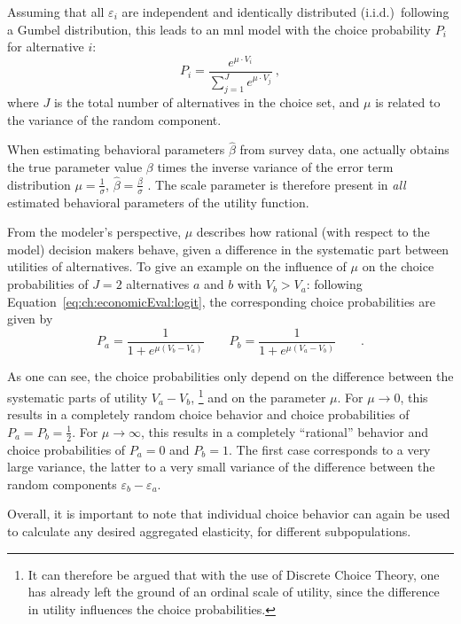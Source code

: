 \begin{oframed}
Assuming that all $\varepsilon_i$ are independent and identically distributed (i.i.d.)\ following a Gumbel distribution, this leads to an \gls{mnl} model with the choice probability $P_i$ for alternative $i$:
%
\begin{equation}
P_{i} = \frac{e^{\mu \cdot V_i}}{\sum_{j=1}^{J} e^{\mu \cdot V_{j}}} \ ,
\label{eq:ch:economicEval:logit}
\end{equation}
%
%
where $J$ is the total number of alternatives in the choice set, and $\mu$ is related to the variance of the random component.%

%
When estimating behavioral parameters $\hat{\beta}$ from survey data, one actually obtains the true parameter value $\beta$ times the inverse variance of the error term distribution $\mu = \frac{1}{\sigma}$, \ie $\hat{\beta} = \frac{\beta}{\sigma}$ \citep[see, e.g.,][p.45, where $\sigma$ is defined as \emph{scale parameter}]{Train2003discreteChoiceBook}. The scale parameter is therefore present in \emph{all} estimated behavioral parameters of the utility function.
%

From the modeler's perspective, $\mu$ describes how rational (with respect to the model) decision makers behave, given a difference in the systematic part between utilities of alternatives. To give an example on the influence of $\mu$ on the choice probabilities of $J=2$ alternatives $a$ and $b$ with $V_b > V_a$: following Equation~\ref{eq:ch:economicEval:logit}, the corresponding choice probabilities are given by
%
\[
P_a = \frac{1}{1 + e^{\mu(V_b - V_a)}} \qquad P_b = \frac{1}{1 + e^{\mu(V_a - V_b)}} \qquad .
\]

%
As one can see, the choice probabilities only depend on the difference between the systematic parts of utility $V_a - V_b$,%
%
\footnote{
%
It can therefore be argued that with the use of Discrete Choice Theory, one has already left the ground of an ordinal scale of utility, since the difference in utility influences the choice probabilities.
%
}
%
and on the parameter $\mu$.
%
For $\mu \to 0$, this results in a completely random choice behavior and choice probabilities of $P_a = P_b = \frac{1}{2}$.
%
For $\mu \to \infty$, this results in a completely ``rational'' behavior and choice probabilities of $P_a = 0$ and $P_b = 1$.
%
The first case corresponds to a very large variance, the latter to a very small variance of the difference between the random components $\varepsilon_b - \varepsilon_a$.

Overall, it is important to note that individual choice behavior can again be used to calculate any desired aggregated elasticity, \eg for different subpopulations.
%
\end{oframed}

